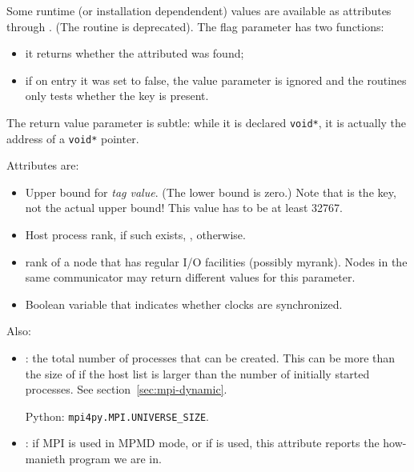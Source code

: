 Some runtime (or installation dependendent) values are available as
attributes through
.
(The  routine  is deprecated).
The flag parameter has two functions:
\begin{itemize}
\item it returns whether the attributed was found;
\item if on entry it was set to false, the value parameter is ignored
  and the routines only tests whether the key is present.
\end{itemize}
The return value parameter is subtle: while it is declared \lstinline{void*},
it is actually the address of a \lstinline{void*} pointer.


Attributes are:
\begin{itemize}
\item {}
  Upper bound for \emph{tag value}.
  (The lower bound is zero.)
  Note that  is the key, not the actual upper bound!
  This value has to be at least 32767.
\item {}
  Host process rank, if such exists, , otherwise.
\item {}
rank of a node that has regular I/O facilities (possibly
myrank). Nodes in the same communicator may return different values
for this parameter.
\item {}
Boolean variable that indicates whether clocks are synchronized.
\end{itemize}

Also:
\begin{itemize}
\item {}: the total number of processes
  that can be created. This can be more than the size of
   if the host list is larger than the number of
  initially started processes. See section~\ref{sec:mpi-dynamic}.

  Python: \lstinline{mpi4py.MPI.UNIVERSE_SIZE}.
\item {}: if MPI is used in \ac{MPMD} mode, or
  if  is used, this attribute
  reports the how-manieth program we are in.
\end{itemize}

